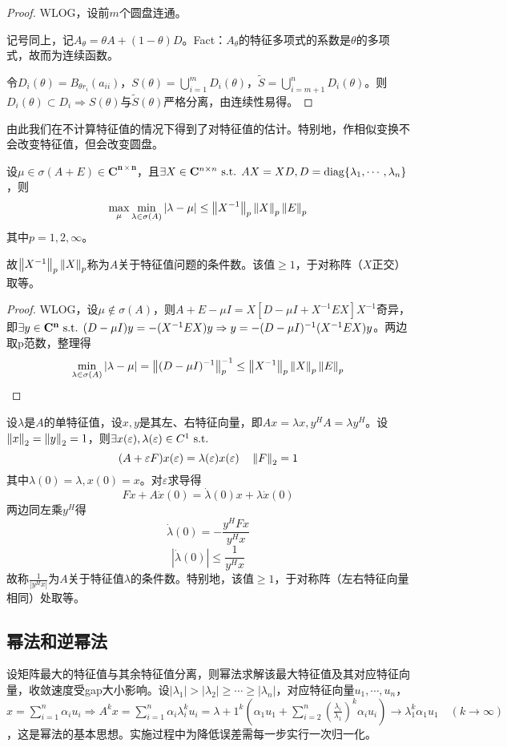 \documentclass{ctexart}
\begin{document}
\begin{proof}
WLOG，设前$m$个圆盘连通。

记号同上，记$A_\theta=\theta A+(1-\theta)D$。Fact：$A_\theta$的特征多项式的系数是$\theta$的多项式，故而为连续函数。

令$D_i(\theta)=B_{\theta r_i}(a_{ii})$，$S(\theta)=\bigcup\limits_{i=1}^m D_i(\theta)$，$\tilde S=\bigcup\limits_{i=m+1}^n D_i(\theta)$。则$D_i(\theta)\subset D_i\Rightarrow S(\theta)$与$\tilde S(\theta)$严格分离，由连续性易得。
\end{proof}

由此我们在不计算特征值的情况下得到了对特征值的估计。特别地，作相似变换不会改变特征值，但会改变圆盘。

\begin{Thm}
设$\mu\in\sigma(A+E)\in\mathbf{C^{n\times n}}$，且$\exists X\in \mathbf{C}^{n\times n}\text{ s.t. } AX=XD,D=\mathrm{diag}\{\lambda_1,\cdots,\lambda_n\}$，则
\[\max_{\mu}\min_{\lambda\in\sigma(A)}|\lambda-\mu|\leq \left\|X^{-1} \right\|_p\left\|X \right\|_p\left\|E \right\|_p\]
其中$p=1,2,\infty$。
\end{Thm}
故$\left\|X^{-1} \right\|_p\left\|X \right\|_p$称为$A$关于特征值问题的条件数。该值$\geq 1$，于对称阵（$X$正交）取等。

\begin{proof}
WLOG，设$\mu\not\in\sigma(A)$，则$A+E-\mu I=X[D-\mu I+X^{-1}EX]X^{-1}$奇异，即$\exists y\in\mathbf{C^n}\text{ s.t. } (D-\mu I)y=-(X^{-1}EX)y\Rightarrow y=-(D-\mu I)^{-1}(X^{-1}EX)y$。两边取p范数，整理得
\[\min_{\lambda\in\sigma(A)}|\lambda-\mu|=\left\|(D-\mu I)^{-1} \right\|^{-1}_p\leq \left\|X^{-1} \right\|_p\left\|X \right\|_p\left\|E \right\|_p\]
\end{proof}

设$\lambda$是$A$的单特征值，设$x,y$是其左、右特征向量，即$Ax=\lambda x,y^HA=\lambda y^H$。设$\left\|x \right\|_2=\left\|y \right\|_2=1$，则$\exists x(\varepsilon),\lambda(\varepsilon)\in C^1\text{ s.t. }$
\[(A+\varepsilon F)x(\varepsilon)=\lambda(\varepsilon)x(\varepsilon)\quad \left\|F \right\|_2=1\]
其中$\lambda(0)=\lambda,x(0)=x$。对$\varepsilon$求导得
\[Fx+A\dot x(0)=\dot\lambda(0)x+\lambda\dot x(0)\]
两边同左乘$y^H$得
\[\dot{\lambda}(0)=-\frac{y^HFx}{y^Hx}\]
\[|\dot\lambda(0)|\leq \frac{1}{y^Hx}\]
故称$\frac{1}{|y^Hx|}$为$A$关于特征值$\lambda$的条件数。特别地，该值$\geq 1$，于对称阵（左右特征向量相同）处取等。


\subsection{幂法和逆幂法}
设矩阵最大的特征值与其余特征值分离，则幂法求解该最大特征值及其对应特征向量，收敛速度受gap大小影响。设$|\lambda_1|>|\lambda_2|\geq\cdots\geq |\lambda_n|$，对应特征向量$u_1,\cdots,u_n$，$x=\sum\limits_{i=1}^n\alpha_i u_i\Rightarrow A^k x=\sum\limits_{i=1}^n\alpha_i\lambda_i^ku_i=\lambda+1^k(\alpha_1 u_1+\sum\limits_{i=2}^n(\frac{\lambda_i}{\lambda_1})^k\alpha_i u_i)\to \lambda_1^k\alpha_1u_1\quad(k\to\infty)$，这是幂法的基本思想。实施过程中为降低误差需每一步实行一次归一化。
\end{document}
